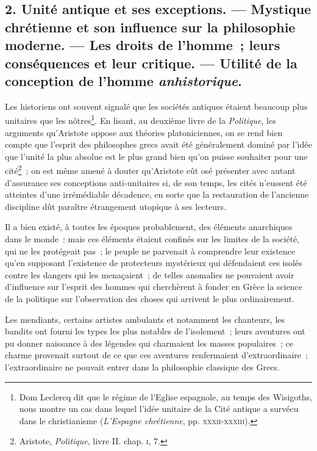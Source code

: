 \documentclass[french,twoside]{book} %
\begin{document}
\subsection[{2. Unité antique et ses exceptions. — Mystique chrétienne et son influence sur la philosophie moderne. — Les droits de l’homme ; leurs conséquences et leur critique. — Utilité de la conception de l’homme anhistorique.}]{2. Unité antique et ses exceptions. — Mystique chrétienne et son influence sur la philosophie moderne. — Les droits de l’homme ; leurs conséquences et leur critique. — Utilité de la conception de l’homme \emph{anhistorique}.}
\label{p37}
\noindent Les historiens ont souvent signalé que les sociétés antiques étaient beaucoup plus unitaires que les  nôtres\footnote{ \noindent Dom Leclercq dit que le régime de l’Eglise espagnole, au temps des Wisigoths, nous montre un cas dans lequel l’idée unitaire de la Cité antique a survécu dans le christianisme (\emph{L’Espagne chrétienne}, pp. {\scshape xxxii-xxxiii}).
 }. En lisant, au deuxième livre de la \emph{Politique}, les arguments qu’Aristote oppose aux théories platoniciennes, on se rend bien compte que l’esprit des philosophes grecs avait été généralement dominé par l’idée que l’unité la plus absolue est le plus grand bien qu’on puisse souhaiter pour une cité\footnote{ \noindent Aristote, \emph{Politique}, livre II. chap. {\scshape i}, 7.
 } ; on est même amené à douter qu’Aristote eût osé présenter avec autant d’assurance ses conceptions anti-unitaires si, de son temps, les cités n’eussent été atteintes d’une irrémédiable décadence, en sorte que la restauration de l’ancienne discipline dût paraître étrangement utopique à ses lecteurs.\par
Il a bien existé, à toutes les époques probablement, des éléments anarchiques dans le monde : mais ces éléments étaient confinés sur les limites de la société, qui ne les protégeait pas ; le peuple ne parvenait à comprendre leur existence qu’en supposant l’existence de protecteurs mystérieux qui défendaient ces isolés contre les dangers qui les menaçaient ; de telles anomalies ne pouvaient avoir d’influence sur l’esprit des hommes qui cherchèrent à fonder en Grèce la science de la politique sur l’observation des choses qui arrivent le plus ordinairement.\par
Les mendiants, certains artistes ambulants et notamment les chanteurs, les bandits ont fourni les types les plus notables de l’isolement ; leurs aventures ont pu  donner naissance à des légendes qui charmaient les masses populaires ; ce charme provenait surtout de ce que ces aventures renfermaient d’extraordinaire ; l’extraordinaire ne pouvait entrer dans la philosophie classique des Grecs.\par
\end{document}
